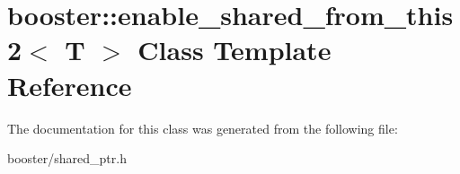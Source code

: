 \section{booster\+:\+:enable\+\_\+shared\+\_\+from\+\_\+this2$<$ T $>$ Class Template Reference}
\label{classbooster_1_1enable__shared__from__this2}


The documentation for this class was generated from the following file\+:\begin{DoxyCompactItemize}
\item 
booster/shared\+\_\+ptr.\+h\end{DoxyCompactItemize}
